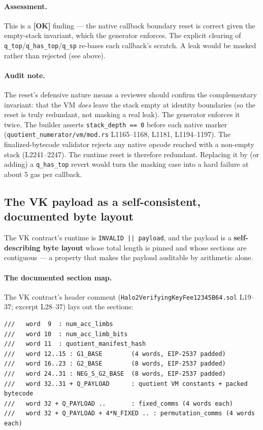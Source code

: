 \paragraph{Assessment.} This is a
\textcolor{tracegreen}{\textbf{[OK]}} finding --- the native
callback boundary reset is correct given the empty-stack invariant,
which the generator enforces. The explicit clearing of
\texttt{q\_top}/\texttt{q\_has\_top}/\texttt{q\_sp} re-bases each
callback's scratch. A leak would be masked rather than rejected
(see above).

\paragraph{Audit note.} The reset's defensive nature means a
reviewer should confirm the complementary invariant: that the VM
\emph{does} leave the stack empty at identity boundaries (so the
reset is truly redundant, not masking a real leak).
 The generator enforces it twice. The builder
asserts \texttt{stack\_depth == 0} before each native marker
(\texttt{quotient\_\allowbreak{}numerator/\allowbreak{}vm/\allowbreak{}mod.rs} L1165--1168, L1181,
L1194--1197). The finalized-bytecode validator rejects any native
opcode reached with a non-empty stack (L2241--2247). The runtime
reset is therefore redundant.  Replacing it by (or
adding) a \texttt{q\_has\_top} revert would turn the masking case
into a hard failure at about 5 gas per callback.

\subsection{The VK payload as a self-consistent, documented byte layout}
\label{sec:pr-vk-layout}

The VK contract's runtime is \texttt{INVALID || payload}, and the
payload is a \textbf{self-describing byte layout} whose total
length is pinned and whose sections are contiguous --- a property
that makes the payload auditable by arithmetic alone.

\paragraph{The documented section map.} The VK contract's header
comment (\texttt{Halo2VerifyingKeyFee12345B64.sol} L19--37; excerpt
L28--37) lays out the sections:
\begin{lstlisting}[style=plain]
///   word  9  : num_acc_limbs
///   word 10  : num_acc_limb_bits
///   word 11  : quotient_manifest_hash
///   word 12..15 : G1_BASE        (4 words, EIP-2537 padded)
///   word 16..23 : G2_BASE        (8 words, EIP-2537 padded)
///   word 24..31 : NEG_S_G2_BASE  (8 words, EIP-2537 padded)
///   word 32..31 + Q_PAYLOAD      : quotient VM constants + packed bytecode
///   word 32 + Q_PAYLOAD ..       : fixed_comms (4 words each)
///   word 32 + Q_PAYLOAD + 4*N_FIXED .. : permutation_comms (4 words each)
\end{lstlisting}


